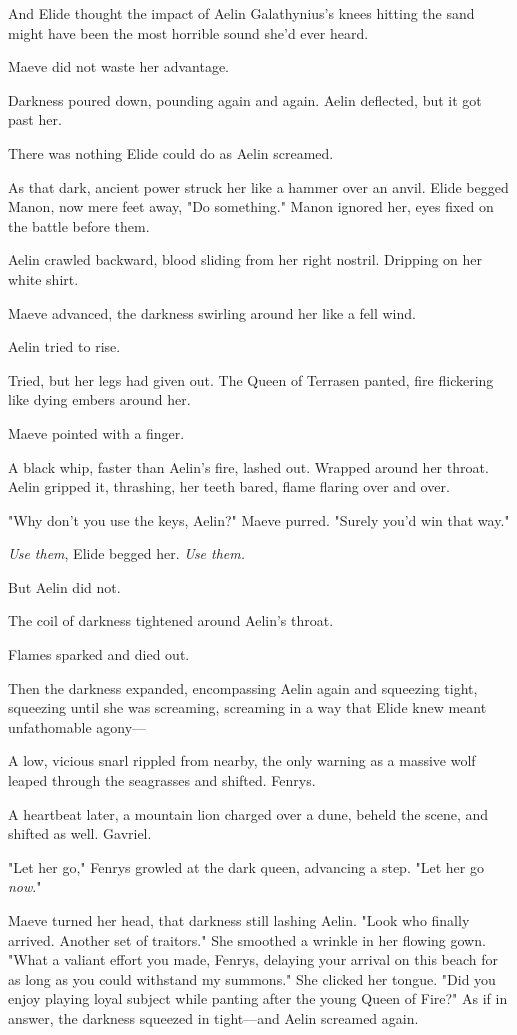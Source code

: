 And Elide thought the impact of Aelin Galathynius's knees hitting the sand might have been the most horrible sound she'd ever heard.

Maeve did not waste her advantage.

Darkness poured down, pounding again and again.
Aelin deflected, but it got past her.

There was nothing Elide could do as Aelin screamed.

As that dark, ancient power struck her like a hammer over an anvil.
Elide begged Manon, now mere feet away, "Do something."
Manon ignored her, eyes fixed on the battle before them.

Aelin crawled backward, blood sliding from her right nostril.
Dripping on her white shirt.

Maeve advanced, the darkness swirling around her like a fell wind.

Aelin tried to rise.

Tried, but her legs had given out.
The Queen of Terrasen panted, fire flickering like dying embers around her.

Maeve pointed with a finger.

A black whip, faster than Aelin's fire, lashed out.
Wrapped around her throat.
Aelin gripped it, thrashing, her teeth bared, flame flaring over and over.

"Why don't you use the keys, Aelin?"
Maeve purred.
"Surely you'd win that way."

\emph{Use them}, Elide begged her.
\emph{Use them.}

But Aelin did not.

The coil of darkness tightened around Aelin's throat.

Flames sparked and died out.

Then the darkness expanded, encompassing Aelin again and squeezing tight, squeezing until she was screaming, screaming in a way that Elide knew meant unfathomable agony---

A low, vicious snarl rippled from nearby, the only warning as a massive wolf leaped through the seagrasses and shifted.
Fenrys.

A heartbeat later, a mountain lion charged over a dune, beheld the scene, and shifted as well.
Gavriel.

"Let her go," Fenrys growled at the dark queen, advancing a step.
"Let her go \emph{now}."

Maeve turned her head, that darkness still lashing Aelin.
"Look who finally arrived.
Another set of traitors."
She smoothed a wrinkle in her flowing gown.
"What a valiant effort you made, Fenrys, delaying your arrival on this beach for as long as you could withstand my summons."
She clicked her tongue.
"Did you enjoy playing loyal subject while panting after the young Queen of Fire?"
As if in answer, the darkness squeezed in tight---and Aelin screamed again.

